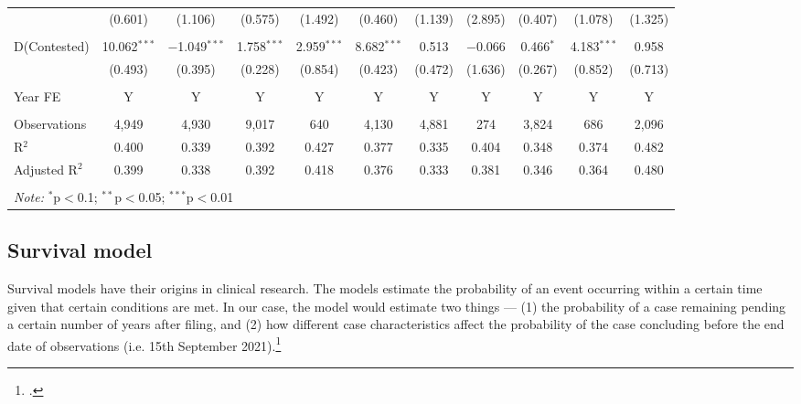 \begin{landscape}
\begin{table}
{\begin{tabular}{lcccccccccc}
 & (0.601) & (1.106) & (0.575) & (1.492) & (0.460) & (1.139) & (2.895) & (0.407) & (1.078) & (1.325) \\ 
 & & & & & & & & & & \\ 
 D(Contested) & 10.062$^{***}$ & $-$1.049$^{***}$ & 1.758$^{***}$ & 2.959$^{***}$ & 8.682$^{***}$ & 0.513 & $-$0.066 & 0.466$^{*}$ & 4.183$^{***}$ & 0.958 \\ 
 & (0.493) & (0.395) & (0.228) & (0.854) & (0.423) & (0.472) & (1.636) & (0.267) & (0.852) & (0.713) \\ 
 \hline \\[-1.8ex]
 Year FE & Y & Y & Y & Y & Y & Y & Y & Y & Y & Y \\
 \hline \\[-1.8ex] 
 Observations & 4,949 & 4,930 & 9,017 & 640 & 4,130 & 4,881 & 274 & 3,824 & 686 & 2,096 \\ 
 R$^{2}$ & 0.400 & 0.339 & 0.392 & 0.427 & 0.377 & 0.335 & 0.404 & 0.348 & 0.374 & 0.482 \\ 
 Adjusted R$^{2}$ & 0.399 & 0.338 & 0.392 & 0.418 & 0.376 & 0.333 & 0.381 & 0.346 & 0.364 & 0.480 \\ 
 \hline \\[-1.8ex] 
 \multicolumn{11}{l}{\textit{Note:} $^{*}$p$<$0.1; $^{**}$p$<$0.05; $^{***}$p$<$0.01} \\ 
 \end{tabular} }
 \end{table}
\end{landscape}

\subsection{Survival model}
\label{sec:survivalModel}

Survival models have their origins in clinical research. The models estimate the probability of an event occurring within a certain time given that certain conditions are met. In our case, the model would estimate two things --- (1) the probability of a case remaining pending a certain number of years after filing, and (2) how different case characteristics affect the probability of the case concluding before the end date of observations (i.e. 15th September 2021).\footcite[For a prior example of the use of hazard models for empirical judicial analysis, see][]{datta2017_itatDelays}

